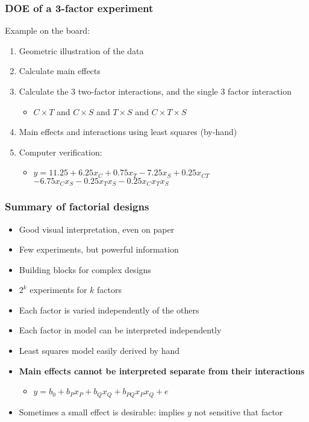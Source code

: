 \begin{frame}\frametitle{DOE of a 3-factor experiment}

	Example on the board:
	\begin{enumerate}
		\item	Geometric illustration of the data
		\item	Calculate main effects
		\item	Calculate the 3 two-factor interactions, and the single 3 factor interaction
		\begin{itemize}
			\item	$C \times T$ and $C \times S$ and $T \times S$ and $C \times T \times S$
		\end{itemize}
		\item	Main effects and interactions using least squares (by-hand)
		\item	Computer verification:
		\begin{itemize}
			\item	$y = 11.25 + 6.25x_C + 0.75x_T -7.25x_S + 0.25 x_{CT}$\\
					$-6.75 x_C x_S -0.25 x_T x_S - 0.25 x_Cx_Tx_S$
		\end{itemize}
	\end{enumerate}
\end{frame}

\begin{frame}\frametitle{Summary of factorial designs}
	\begin{itemize}
		\item	Good visual interpretation, even on paper
		\item	Few experiments, but powerful information
		\item	Building blocks for complex designs
		\item	$2^k$ experiments for $k$ factors
		\item	Each factor is varied independently of the others
		\item	Each factor in model can be interpreted independently
		\item	Least squares model easily derived by hand
		\item	\textbf{Main effects cannot be interpreted separate from their interactions}
		\begin{itemize}
			\item	$y = b_0 + b_P x_P + b_Q x_Q + b_{PQ} x_Px_Q + e$
		\end{itemize}
		\item	Sometimes a small effect is desirable: implies $y$ not sensitive that factor
	\end{itemize}
\end{frame}

